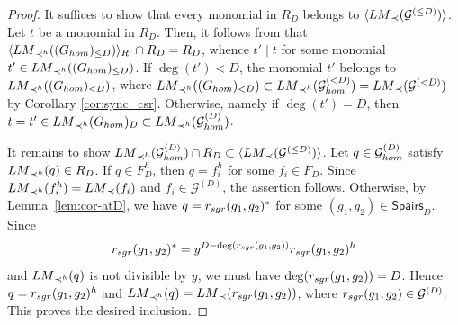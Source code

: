 \documentclass{article}
\theoremstyle{definition}
\theoremstyle{plain}
\theoremstyle{plain}
\theoremstyle{plain}
\theoremstyle{plain}
\numberwithin{equation}{subsection}
\begin{document}
\begin{proof}
It suffices to show that every monomial in $R_D$ belongs to $\langle {\rm LM}_{\prec}(\mathcal{G}^{(\leq D)})\rangle$.
Let $t$ be a monomial in $R_D$.
Then, it follows from \cite[Lemma 3]{KY} that $\langle {\rm LM}_{\prec^h}((G_{\rm hom})_{\leq D})\rangle_{R'}\cap R_D=R_D$, whence $t'\mid t$ for some monomial $t'\in  {\rm LM}_{\prec^h}((G_{\rm hom})_{\leq D})$.
If $\deg(t')<D$, the monomial $t'$ belongs to ${\rm LM}_{\prec^h}((G_{\rm hom})_{< D})$, where ${\rm LM}_{\prec^h}((G_{\rm hom})_{< D}) \subset {\rm LM}_{\prec^h}(\mathcal{G}_{\rm hom}^{(< D)})={\rm LM}_{\prec}(\mathcal{G}^{(<D)})$ by Corollary \ref{cor:sync_csr}.
Otherwise, namely if $\deg(t')=D$, then $t=t'\in {\rm LM}_{\prec^h}(G_{\rm hom})_D \subset {\rm LM}_{\prec^h}(\mathcal{G}_{\rm hom}^{(D)})$.

It remains to show ${\rm LM}_{\prec^h}(\mathcal{G}_{\rm hom}^{(D)})\cap R_D \subset \langle {\rm LM}_{\prec}(\mathcal{G}^{(\leq D)})\rangle$.
Let $q\in\mathcal{G}_{\rm hom}^{(D)}$ satisfy ${\rm LM}_{\prec^h}(q)\in R_D$.
If $q\in F_D^h$, then $q=f_i^h$ for some $f_i\in F_D$.
Since ${\rm LM}_{\prec^h}(f_i^h)={\rm LM}_{\prec}(f_i)$ and $f_i\in\mathcal G^{(D)}$, the assertion follows.
Otherwise, by Lemma~\ref{lem:cor-atD}, we have $q=r_{\rm sgr}(g_1,g_2)^*$ for some $(g_1,g_2)\in\mathsf{Spairs}_D$.
Since
\[
r_{\rm sgr}(g_1,g_2)^*
=
y^{D-\deg(r_{\rm sgr}(g_1,g_2))}
r_{\rm sgr}(g_1,g_2)^h
\]
and ${\rm LM}_{\prec^h}(q)$ is not divisible by $y$, we must have $\deg(r_{\rm sgr}(g_1,g_2))=D$.
Hence $q=r_{\rm sgr}(g_1,g_2)^h$ and ${\rm LM}_{\prec^h}(q) ={\rm LM}_{\prec}(r_{\rm sgr}(g_1,g_2))$, where $r_{\rm sgr}(g_1,g_2)\in\mathcal G^{(D)}$.
This proves the desired inclusion.
\end{proof}
\end{document}
